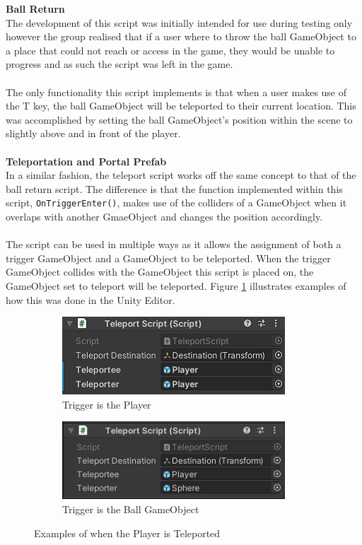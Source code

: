 \noindent \textbf{Ball Return}\\
The development of this script was initially intended for use during testing only however the group realised that if a user where to throw the ball GameObject to a place that could not reach or access in the game, they would be unable to progress and as such the script was left in the game. 
\\\\
The only functionality this script implements is that when a user makes use of the T key, the ball GameObject will be teleported to their current location. This was accomplished by setting the ball GameObject's position within the scene to slightly above and in front of the player.
\\\\
\textbf{Teleportation and Portal Prefab}\\
In a similar fashion, the teleport script works off the same concept to that of the ball return script. The difference is that the function implemented within this script, \texttt{OnTriggerEnter()}, makes use of the colliders of a GameObject when it overlaps with another GmaeObject and changes the position accordingly.
\\\\
The script can be used in multiple ways as it allows the assignment of both a trigger GameObject and a GameObject to be teleported. When the trigger GameObject collides with the GameObject this script is placed on, the GameObject set to teleport will be teleported. Figure \ref{tp} illustrates examples of how this was done in the Unity Editor.
\begin{figure}[H]
\centering
\begin{subfigure}{0.5\textwidth}
  \centering
  \includegraphics[width=1\linewidth]{Figures/tpp.png}
  \caption{Trigger is the Player}
\end{subfigure}%
\begin{subfigure}{0.5\textwidth}
  \centering
  \includegraphics[width=1\linewidth]{Figures/tps.png}
  \caption{Trigger is the Ball GameObject}
\end{subfigure}
\caption{Examples of when the Player is Teleported}
\label{tp}
\end{figure}

